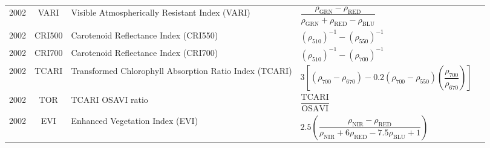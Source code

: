 \documentclass[10pt]{article}
\begin{document}
\begin{ThreePartTable}
\begin{longtable}{c c m{2.80in} M{2.80in} M{1.5in}}
  2002 & VARI    & Visible Atmospherically Resistant Index (VARI)                                 & $\dfrac{\rho_\text{GRN}-\rho_\text{RED}}{\rho_\text{GRN}+\rho_\text{RED}-\rho_\text{BLU}}$                                                                                                                                                                                              & \citet{Gitelson2002b}                               \\
  2002 & CRI500  & Carotenoid Reflectance Index (CRI550)                                          & $(\rho_{510})^{-1}-(\rho_{550})^{-1}$                                                                                                                                                                                                                                                   & \citet{Gitelson2002a}                               \\
  2002 & CRI700  & Carotenoid Reflectance Index (CRI700)                                          & $(\rho_{510})^{-1}-(\rho_{700})^{-1}$                                                                                                                                                                                                                                                   & \citet{Gitelson2002a}                               \\
  2002 & TCARI   & Transformed Chlorophyll Absorption Ratio Index (TCARI)                         & $3\left[(\rho_{700}-\rho_{670})-0.2(\rho_{700}-\rho_{550})\left(\dfrac{\rho_{700}}{\rho_{670}}\right)\right]$                                                                                                                                                                           & \citet{Haboudane2002}                               \\
  2002 & TOR     & TCARI OSAVI ratio                                                              & $\dfrac{\text{TCARI}}{\text{OSAVI}}$                                                                                                                                                                                                                                                    & \citet{Haboudane2002}                               \\
  2002 & EVI     & Enhanced Vegetation Index (EVI)                                                & $2.5\left(\dfrac{\rho_\text{NIR}-\rho_\text{RED}}{\rho_\text{NIR}+6\rho_\text{RED}-7.5\rho_\text{BLU} + 1}\right)$                                                                                                                                                                      & \citet{Huete2002}                                   \\

\end{longtable}
\end{ThreePartTable}
\end{document}
